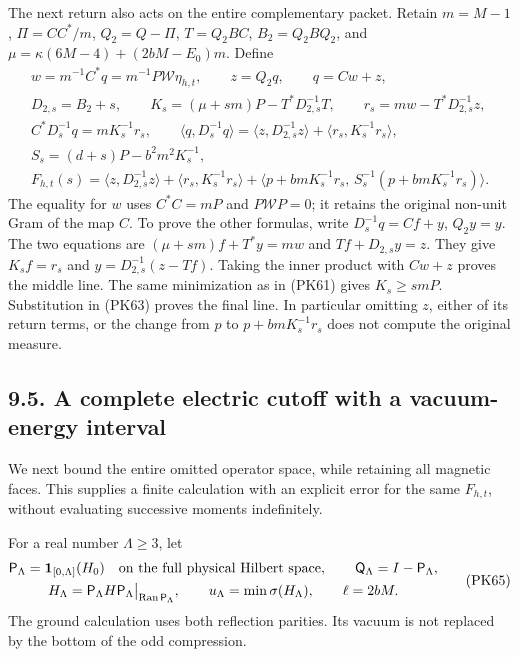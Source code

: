 \documentclass[11pt]{article}
\begin{document}
The next return also acts on the entire complementary packet. Retain
\(m=M-1\), \(\Pi=CC^*/m\), \(Q_2=Q-\Pi\), \(T=Q_2BC\), \(B_2=Q_2BQ_2\),
and \(\mu=\kappa(6M-4)+(2bM-E_0)m\). Define
\[
 \begin{gathered}
 w=m^{-1}C^*q=m^{-1}P\mathcal W\eta_{h,t},\qquad
 z=Q_2q,\qquad q=Cw+z,\\
 D_{2,s}=B_2+s,\qquad
 K_s=(\mu+sm)P-T^*D_{2,s}^{-1}T,\qquad
 r_s=mw-T^*D_{2,s}^{-1}z,\\
 C^*D_s^{-1}q=mK_s^{-1}r_s,\qquad
 \langle q,D_s^{-1}q\rangle
   =\langle z,D_{2,s}^{-1}z\rangle+\langle r_s,K_s^{-1}r_s\rangle,\\
 S_s=(d+s)P-b^2m^2K_s^{-1},\\
 F_{h,t}(s)=
 \langle z,D_{2,s}^{-1}z\rangle+\langle r_s,K_s^{-1}r_s\rangle+
 \langle p+bmK_s^{-1}r_s,\,
 S_s^{-1}(p+bmK_s^{-1}r_s)\rangle .
 \end{gathered}\tag{PK64}
\]
The equality for \(w\) uses \(C^*C=mP\) and \(P\mathcal WP=0\);
it retains the original non-unit Gram of the map \(C\).
To prove the other formulas, write \(D_s^{-1}q=Cf+y\), \(Q_2y=y\).
The two equations are
\((\mu+sm)f+T^*y=mw\) and \(Tf+D_{2,s}y=z\).
They give \(K_sf=r_s\) and \(y=D_{2,s}^{-1}(z-Tf)\).
Taking the inner product with \(Cw+z\) proves the middle line.
The same minimization as in (PK61) gives \(K_s\ge smP\).
Substitution in (PK63) proves the final line. In particular omitting
\(z\), either of its return terms, or the change from \(p\) to
\(p+bmK_s^{-1}r_s\) does not compute the original measure.

\subsection*{9.5. A complete electric cutoff with a vacuum-energy interval}

We next bound the entire omitted operator space, while retaining all
magnetic faces. This supplies a finite calculation with an explicit
error for the same \(F_{h,t}\), without evaluating successive moments
indefinitely.

For a real number \(\Lambda\ge3\), let
\[
 \begin{gathered}
 \mathsf P_\Lambda=\mathbf1_{[0,\Lambda]}(H_0)
       \quad\hbox{on the full physical Hilbert space},\qquad
 \mathsf Q_\Lambda=I-\mathsf P_\Lambda,\\
 H_\Lambda=\mathsf P_\Lambda H\mathsf P_\Lambda
          \big|_{\operatorname{Ran}\mathsf P_\Lambda},\qquad
 u_\Lambda=\min\sigma(H_\Lambda),\qquad
 \ell=2bM .
 \end{gathered}\tag{PK65}
\]
The ground calculation uses both reflection parities. Its vacuum is
not replaced by the bottom of the odd compression.
\end{document}
